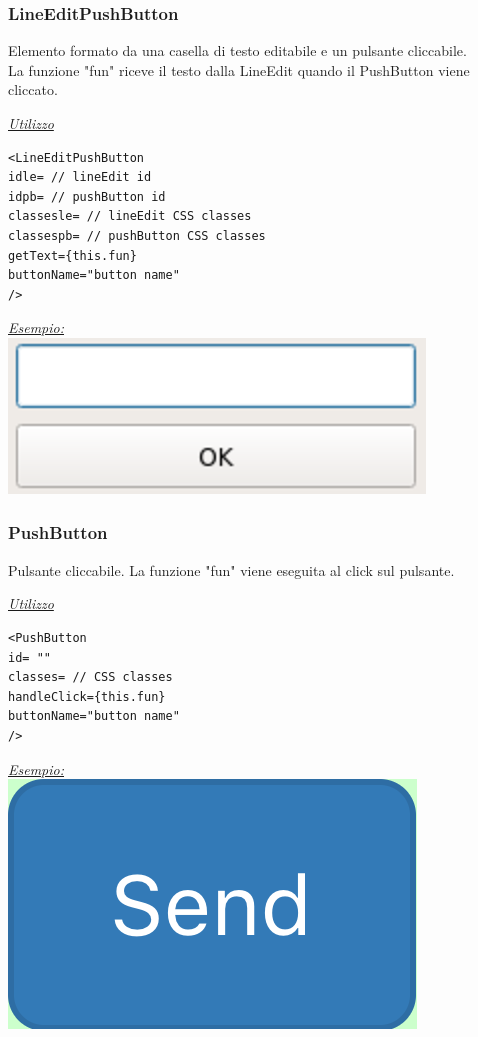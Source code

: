 \subsubsection{LineEditPushButton}
Elemento formato da una casella di testo editabile e un pulsante cliccabile.\\
La funzione "fun" riceve il testo dalla LineEdit quando il PushButton viene cliccato.
\begin{center}
\underline{\textit{Utilizzo}}
\begin{lstlisting}
<LineEditPushButton
idle= // lineEdit id
idpb= // pushButton id
classesle= // lineEdit CSS classes
classespb= // pushButton CSS classes
getText={this.fun}
buttonName="button name"
/>
\end{lstlisting}
\underline{\textit{Esempio:}}
\\
\includegraphics[scale=0.75]{img/LEPush.png}
\\
\end{center}

\subsubsection{PushButton}
Pulsante cliccabile. La funzione "fun" viene eseguita al click sul pulsante.
\begin{center}
\underline{\textit{Utilizzo}}
\begin{lstlisting}
<PushButton
id= ""
classes= // CSS classes
handleClick={this.fun}
buttonName="button name"
/>
\end{lstlisting}
\underline{\textit{Esempio:}}
\\
\includegraphics[scale=0.25]{img/pushB.png}
\\
\end{center}
\newpage
